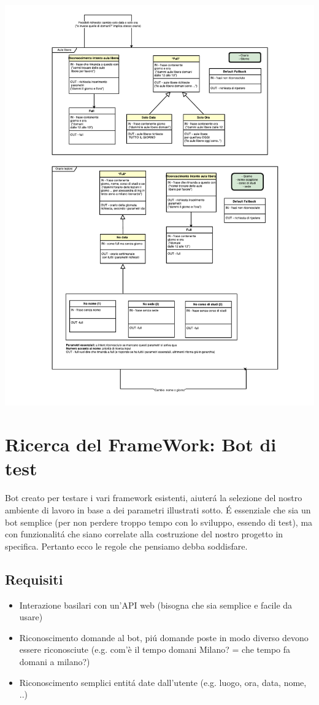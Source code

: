 \documentclass[]{article}
\begin{document}
\vspace*{-3cm}
\hspace*{-3cm} 
\includegraphics[width=1.6\textwidth]{p04}
\thispagestyle{empty}

\section{Ricerca del FrameWork: Bot di test}
Bot creato per testare i vari framework esistenti, aiuterá la selezione del nostro ambiente di lavoro in base a dei parametri illustrati sotto. É essenziale che sia un bot semplice (per non perdere troppo tempo con lo sviluppo, essendo di test), ma con funzionalitá che siano correlate alla costruzione del nostro progetto in specifica. Pertanto ecco le regole che pensiamo debba soddisfare.

\subsection{Requisiti}
\begin{itemize}
\item Interazione basilari con un’API web (bisogna che sia semplice e facile da usare)
\item Riconoscimento domande al bot, piú domande poste in modo diverso devono essere riconosciute (e.g. com'è il tempo domani Milano? = che tempo fa domani a milano?)
\item Riconoscimento semplici entitá date dall’utente (e.g. luogo, ora, data, nome, ..)
\end{itemize}
\end{document}

